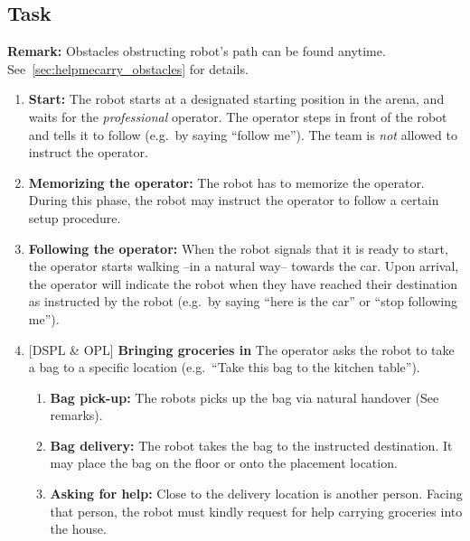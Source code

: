 \subsection{Task}
\textbf{Remark:} Obstacles obstructing robot's path can be found anytime. See~\ref{sec:helpmecarry_obstacles} for details.
\begin{enumerate}
  \item \textbf{Start:} The robot starts at a designated starting position in the arena, and waits for the \textit{professional} operator. The operator steps in front of the robot and tells it to follow (e.g.~by saying \enquote{follow me}). The team is \emph{not} allowed to instruct the operator.

  \item \textbf{Memorizing the operator:} The robot has to memorize the operator. During this phase, the robot may instruct the operator to follow a certain setup procedure.

  \item \textbf{Following the operator:} When the robot signals that it is ready to start, the operator starts walking --in a natural way-- towards the car. Upon arrival, the operator will indicate the robot when they have reached their destination as instructed by the robot (e.g.~by saying \enquote{here is the car} or \enquote{stop following me}).

  \setcounter{enumTemp}{\theenumi}
  \item {[DSPL \& OPL]} \textbf{Bringing groceries in}
  The operator asks the robot to take a bag to a specific location (e.g.~\enquote{Take this bag to the kitchen table}).
  \begin{enumerate}
    \item \textbf{Bag pick-up:} The robots picks up the bag via natural handover (See remarks).
    \item \textbf{Bag delivery:} The robot takes the bag to the instructed destination. It may place the bag on the floor or onto the placement location.
    \item \textbf{Asking for help:} Close to the delivery location is another person. Facing that person, the robot must kindly request for help carrying groceries into the house.
  \end{enumerate}


\end{enumerate}
